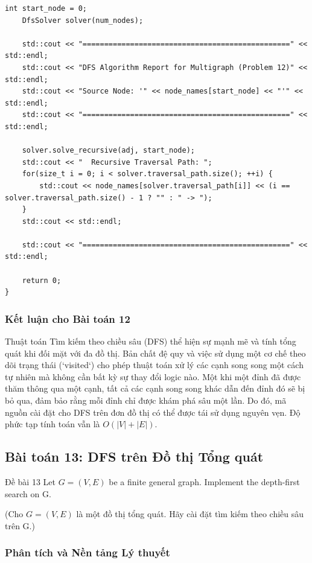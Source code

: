 \documentclass[a4paper,12pt]{article}
\begin{document}
\begin{lstlisting}[style=cppstyle, caption={Cài đặt DFS cho đa đồ thị trong C++.}, label={lst:cpp_dfs_12}]
    int start_node = 0;
    DfsSolver solver(num_nodes);

    std::cout << "================================================" << std::endl;
    std::cout << "DFS Algorithm Report for Multigraph (Problem 12)" << std::endl;
    std::cout << "Source Node: '" << node_names[start_node] << "'" << std::endl;
    std::cout << "================================================" << std::endl;
    
    solver.solve_recursive(adj, start_node);
    std::cout << "  Recursive Traversal Path: ";
    for(size_t i = 0; i < solver.traversal_path.size(); ++i) {
        std::cout << node_names[solver.traversal_path[i]] << (i == solver.traversal_path.size() - 1 ? "" : " -> ");
    }
    std::cout << std::endl;
    
    std::cout << "================================================" << std::endl;

    return 0;
}
\end{lstlisting}

\subsubsection{Kết luận cho Bài toán 12}
Thuật toán Tìm kiếm theo chiều sâu (DFS) thể hiện sự mạnh mẽ và tính tổng quát khi đối mặt với đa đồ thị. Bản chất đệ quy và việc sử dụng một cơ chế theo dõi trạng thái (`visited`) cho phép thuật toán xử lý các cạnh song song một cách tự nhiên mà không cần bất kỳ sự thay đổi logic nào. Một khi một đỉnh đã được thăm thông qua một cạnh, tất cả các cạnh song song khác dẫn đến đỉnh đó sẽ bị bỏ qua, đảm bảo rằng mỗi đỉnh chỉ được khám phá sâu một lần. Do đó, mã nguồn cài đặt cho DFS trên đơn đồ thị có thể được tái sử dụng nguyên vẹn. Độ phức tạp tính toán vẫn là $O(|V| + |E|)$.


\subsection{Bài toán 13: DFS trên Đồ thị Tổng quát}
\begin{problembox}{Đề bài 13}
    Let $G = (V,E)$ be a finite general graph. Implement the depth-first search on G.
    
    (Cho $G = (V,E)$ là một đồ thị tổng quát. Hãy cài đặt tìm kiếm theo chiều sâu trên G.)
\end{problembox}

\subsubsection{Phân tích và Nền tảng Lý thuyết}
\end{document}

